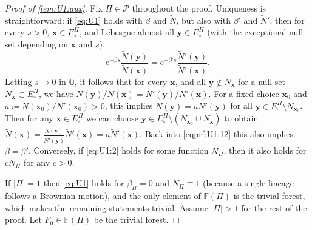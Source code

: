 \documentclass[reqno,draft]{amsart}
\numberwithin{equation}{section}
\theoremstyle{plain}
\theoremstyle{remark}
\newcommand{\Q}{\mathbb{Q}} %
\newcommand{\e}{\mathrm{e}}
\newcommand{\fpart}{\Pi} %
\newcommand{\nn}{\widetilde{N}} %
\newcommand{\la}{\beta} %
\begin{document}
\begin{proof}[Proof of \cref{lem:U1:aux}]
    Fix $\fpart \in \mathcal{P}$ throughout the proof.
    Uniqueness is straightforward: if \cref{eq:U1} holds with $\la$ and $\nn$, but also with $\la'$ and $\nn'$, then for every $s > 0$, $\boldsymbol x\in E^\fpart_\circ $, and Lebesgue-almost all $\boldsymbol y\in E^\fpart_\circ $ (with the exceptional null-set depending on $\boldsymbol x$ and $s$),
    \begin{equation}\label{eqprf:U1:12}
        \e^{-\la s} \frac{\nn(\boldsymbol y)}{\nn(\boldsymbol x)} = \e^{-\la' s} \frac{\nn'(\boldsymbol y)}{\nn'(\boldsymbol x)}.
    \end{equation}
    Letting $s \to 0$ in $\Q$, it follows that for every $\boldsymbol x$, and all $\boldsymbol y\not\in N_{\boldsymbol x}$ for a null-set $N_{\boldsymbol x}\subset E^\fpart_\circ $, we have $\nn(\boldsymbol y) / \nn(\boldsymbol x) = \nn'(\boldsymbol y) / \nn'(\boldsymbol x)$. For a fixed choice $\boldsymbol x_0$ and $a \coloneqq \nn(\boldsymbol x_0) / \nn'(\boldsymbol x_0) > 0$, this implies $\nn(\boldsymbol y) = a \nn'(\boldsymbol y)$ for all $\boldsymbol y\in E^\fpart_\circ  \setminus N_{\boldsymbol x_0}$. Then for any $\boldsymbol x\in E^\fpart_\circ $ we can choose $\boldsymbol y\in E^\fpart_\circ  \setminus (N_{\boldsymbol x_0}\cup N_{\boldsymbol x})$ to obtain $
        \nn(\boldsymbol x) = \frac{\nn(\boldsymbol y)}{\nn'(\boldsymbol y)} \nn'(\boldsymbol x) = a \nn'(\boldsymbol x).
        $ Back into \cref{eqprf:U1:12} this also implies $\la = \la'$. Conversely, if \cref{eq:U1:2} holds for some function $\nn_\fpart$, then it also holds for $c\nn_\fpart$ for any $c > 0$.

    If $|\fpart| = 1$ then \cref{eq:U1} holds for $\beta_\fpart = 0$ and $\nn_\fpart \equiv 1$ (because a single lineage follows a Brownian motion), and the only element of $\mathbb{F}(\fpart)$ is the trivial forest, which makes the remaining statements trivial. Assume $|\fpart| > 1$ for the rest of the proof. Let $F_0\in \mathbb{F}(\fpart)$ be the trivial forest.


\end{proof}
\end{document}
